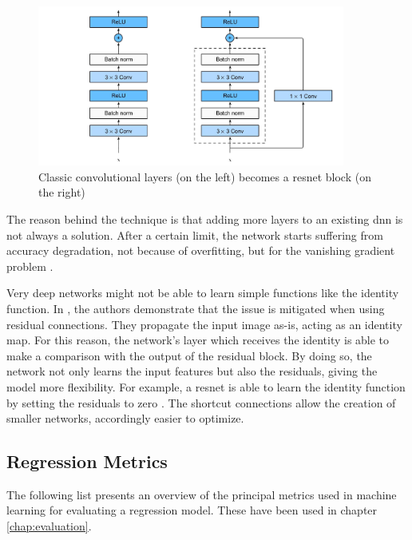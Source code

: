 \begin{figure}[!h]
	\centering
	\includegraphics[width=0.9\textwidth]{"contents/images/02-resnet-blocks"}
	\caption[\gls{resnet} formation]{Classic convolutional layers (on the left) becomes a \gls{resnet} block (on the right) \cite{resnet_1}}
	\label{fig:resnet-blocks}
\end{figure}

The reason behind the technique is that adding more layers to an existing \gls{dnn} is not always a solution. After a certain limit, the network starts suffering from accuracy degradation, not because of overfitting, but for the vanishing gradient problem \cite{hochreiter1998vanishing}. 

Very deep networks might not be able to learn simple functions like the identity function. In \cite{he2015deep}, the authors demonstrate that the issue is mitigated when using residual connections. They propagate the input image as-is, acting as an identity map. For this reason, the network's layer which receives the identity is able to make a comparison with the output of the residual block. By doing so, the network not only learns the input features but also the residuals, giving the model more flexibility. For example, a \gls{resnet} is able to learn the identity function by setting the residuals to zero \cite{resnet_2}. The shortcut connections allow the creation of smaller networks, accordingly easier to optimize.



\subsection{Regression Metrics}
\label{subsec:metrics}

The following list presents an overview of the principal metrics used in machine learning for evaluating a regression model. These have been used in chapter \ref{chap:evaluation}.

